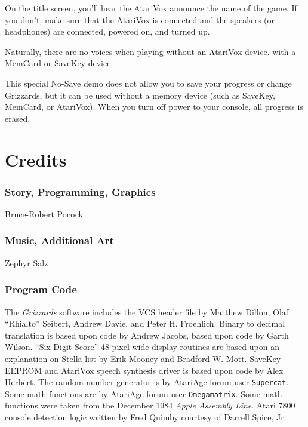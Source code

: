 \documentclass[9pt,twocolumn,openany,article]{memoir}
\begin{document}
On the title  screen, you'll hear the AtariVox announce  the name of the
game. If  you don't, make  sure that the  AtariVox is connected  and the
speakers (or headphones) are connected, powered on, and turned up.

Naturally,  there are  no  voices  when playing  \ifdefined\ATARIAGESAVE
without an AtariVox device. \else with a MemCard or SaveKey device. \fi

\fi

\ifdefined\NOSAVE

{}

This special  No-Save demo does not  allow you to save  your progress or
change Grizzards,  but it can be  used without a memory  device (such as
SaveKey, MemCard, or AtariVox). When you turn off power to your console,
all progress is erased.

\fi

\fi %




\chapter{Credits}

\subsection{Story, Programming, Graphics}

Bruce-Robert Pocock

\subsection{Music, Additional Art}

Zephyr Salz

\subsection{Program Code}

{ \small The \textit{Grizzards} software includes the VCS header file by
  Matthew Dillon, Olaf  ``Rhialto'' Seibert, Andrew Davie,  and Peter H.
  Froehlich. Binary to decimal translation  is based upon code by Andrew
  Jacobs, based upon code by Garth  Wilson. ``Six Digit Score'' 48 pixel
  wide display routines are based upon  an explanation on Stella list by
  Erik Mooney and Bradford W. Mott. \ifdefined\ATARIAGESAVE\else SaveKey
  EEPROM and \fi{}  AtariVox speech synthesis driver is  based upon code
  by Alex Herbert. The random number generator is by AtariAge forum user
  \texttt{Supercat}.  Some math  functions  are by  AtariAge forum  user
  \texttt{Omega\-matrix}.  Some  math  functions  were  taken  from  the
  December  1984  \textit{Apple  Assembly   Line}.  Atari  7800  console
  detection  logic written  by Fred  Quimby courtesy  of Darrell  Spice,
  Jr. }
\end{document}
